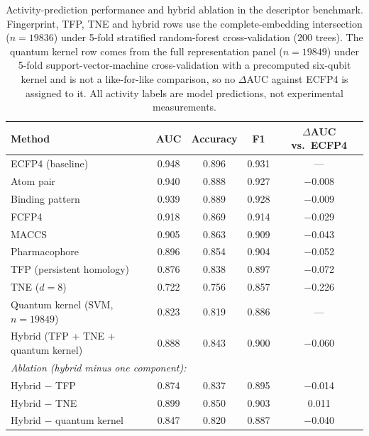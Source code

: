 \begin{table}[htbp]
	\centering
	\caption[Activity prediction and hybrid ablation]{Activity-prediction performance and hybrid ablation in the descriptor benchmark. Fingerprint, TFP, TNE and hybrid rows use the complete-embedding intersection ($n = \num{19836}$) under 5-fold stratified random-forest cross-validation ($\num{200}$ trees). The quantum kernel row comes from the full representation panel ($n = \num{19849}$) under 5-fold support-vector-machine cross-validation with a precomputed six-qubit kernel and is not a like-for-like comparison, so no $\Delta$AUC against ECFP4 is assigned to it. All activity labels are model predictions, not experimental measurements.}
	\label{tab:res_p3_benchmark}
	\small
	\begin{tabular}{l c c c c}
		\toprule
		Method & AUC & Accuracy & F1 & $\Delta$AUC vs.\ ECFP4 \\
		\midrule
		ECFP4 (baseline) & \num{0.948} & \num{0.896} & \num{0.931} & --- \\
		Atom pair & \num{0.940} & \num{0.888} & \num{0.927} & \num{-0.008} \\
		Binding pattern & \num{0.939} & \num{0.889} & \num{0.928} & \num{-0.009} \\
		FCFP4 & \num{0.918} & \num{0.869} & \num{0.914} & \num{-0.029} \\
		MACCS & \num{0.905} & \num{0.863} & \num{0.909} & \num{-0.043} \\
		Pharmacophore & \num{0.896} & \num{0.854} & \num{0.904} & \num{-0.052} \\
		TFP (persistent homology) & \num{0.876} & \num{0.838} & \num{0.897} & \num{-0.072} \\
		TNE ($d = \num{8}$) & \num{0.722} & \num{0.756} & \num{0.857} & \num{-0.226} \\
		Quantum kernel (SVM, $n = \num{19849}$) & \num{0.823} & \num{0.819} & \num{0.886} & --- \\
		Hybrid (TFP + TNE + quantum kernel) & \num{0.888} & \num{0.843} & \num{0.900} & \num{-0.060} \\
		\midrule
		\multicolumn{5}{l}{\emph{Ablation (hybrid minus one component):}} \\
		Hybrid $-$ TFP & \num{0.874} & \num{0.837} & \num{0.895} & \num{-0.014} \\
		Hybrid $-$ TNE & \num{0.899} & \num{0.850} & \num{0.903} & \num{+0.011} \\
		Hybrid $-$ quantum kernel & \num{0.847} & \num{0.820} & \num{0.887} & \num{-0.040} \\
		\bottomrule
	\end{tabular}
\end{table}

